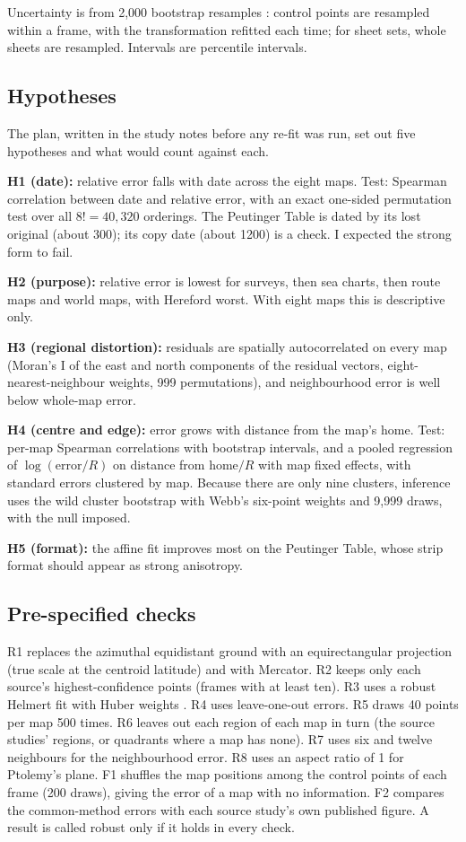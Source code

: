 \documentclass[11pt,a4paper]{article}
\begin{document}
Uncertainty is from 2,000 bootstrap resamples \citep{efron1993}: control points are resampled within a frame, with the transformation refitted each time; for sheet sets, whole sheets are resampled. Intervals are percentile intervals.

\subsection{Hypotheses}
The plan, written in the study notes before any re-fit was run, set out five hypotheses and what would count against each.

\textbf{H1 (date):} relative error falls with date across the eight maps. Test: Spearman correlation between date and relative error, with an exact one-sided permutation test over all $8! = 40{,}320$ orderings. The Peutinger Table is dated by its lost original (about 300); its copy date (about 1200) is a check. I expected the strong form to fail.

\textbf{H2 (purpose):} relative error is lowest for surveys, then sea charts, then route maps and world maps, with Hereford worst. With eight maps this is descriptive only.

\textbf{H3 (regional distortion):} residuals are spatially autocorrelated on every map (Moran's I \citep{moran1950} of the east and north components of the residual vectors, eight-nearest-neighbour weights, 999 permutations), and neighbourhood error is well below whole-map error.

\textbf{H4 (centre and edge):} error grows with distance from the map's home. Test: per-map Spearman correlations with bootstrap intervals, and a pooled regression of $\log(\text{error}/R)$ on distance from home$/R$ with map fixed effects, with standard errors clustered by map. Because there are only nine clusters, inference uses the wild cluster bootstrap \citep{cameron2008} with Webb's six-point weights \citep{webb2023} and 9,999 draws, with the null imposed.

\textbf{H5 (format):} the affine fit improves most on the Peutinger Table, whose strip format should appear as strong anisotropy.

\subsection{Pre-specified checks}
R1 replaces the azimuthal equidistant ground with an equirectangular projection (true scale at the centroid latitude) and with Mercator. R2 keeps only each source's highest-confidence points (frames with at least ten). R3 uses a robust Helmert fit with Huber weights \citep{huber1964}. R4 uses leave-one-out errors. R5 draws 40 points per map 500 times. R6 leaves out each region of each map in turn (the source studies' regions, or quadrants where a map has none). R7 uses six and twelve neighbours for the neighbourhood error. R8 uses an aspect ratio of 1 for Ptolemy's plane. F1 shuffles the map positions among the control points of each frame (200 draws), giving the error of a map with no information. F2 compares the common-method errors with each source study's own published figure. A result is called robust only if it holds in every check.
\end{document}
